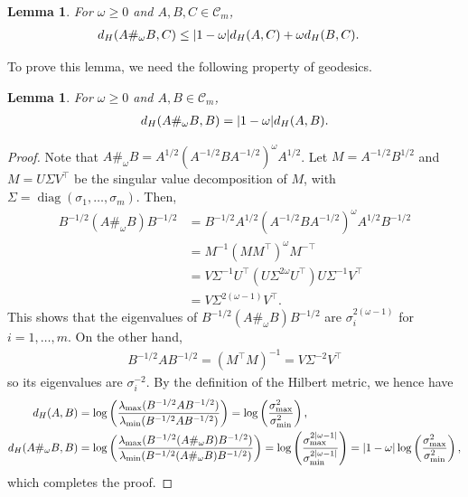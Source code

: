 \documentclass[a4paper]{article}
\newcommand{\caC}{\mathcal{C}}
\DeclareMathOperator{\diag}{diag}
\DeclarePairedDelimiter{\abs}{\lvert}{\rvert}
\newtheorem{lemma}[theorem]{Lemma}
\theoremstyle{definition}
\numberwithin{equation}{section}
\begin{document}
\begin{lemma}\label{lem:Hilbert-omega}
For $\omega \geq 0$ and $A, B, C \in \caC_m$,
\begin{align*}
 d_H(A \#_{\omega} B, C) &\leq \abs{1-\omega} d_H(A, C) + \omega d_H(B, C).
\end{align*}
\end{lemma}

To prove this lemma, we need the following property of geodesics.

\begin{lemma}\label{lem:Hilbert-delta}
For $\omega \ge 0$ and $A, B \in \caC_m$,
\begin{align*}
 d_H(A \#_\omega B, B) = \abs{1-\omega} d_H(A, B).
\end{align*}
\end{lemma}
\begin{proof}
Note that $A \#_\omega B = A^{1/2} (A^{-1/2} B A^{-1/2})^\omega A^{1/2}$. Let $M = A^{-1/2}B^{1/2}$ and $M = U \Sigma V^\top$ be the singular value decomposition of $M$, with $\Sigma = \diag(\sigma_1,\dots,\sigma_m)$. Then, 
\begin{align*}
 B^{-1/2} (A \#_\omega B) B^{-1/2} 
 &= B^{-1/2} A^{1/2} (A^{-1/2} B A^{-1/2})^\omega A^{1/2} B^{-1/2} \\
 &= M^{-1} (MM^\top)^\omega M^{-\top} \\
 &= V\Sigma^{-1} U^\top (U \Sigma^{2\omega} U^\top) U \Sigma^{-1} V^\top \\
 &= V\Sigma^{2(\omega - 1)} V^\top.
\end{align*}
This shows that the eigenvalues of $B^{-1/2} (A \#_\omega B) B^{-1/2}$ are $\sigma_i^{2(\omega -1)}$ for $i=1, \dots, m$. On the other hand, 
\begin{align*}
 B^{-1/2} A B^{-1/2} = (M^\top M)^{-1} = V \Sigma^{-2} V^\top
\end{align*}
so its eigenvalues are $\sigma_i^{-2}$. By the definition of the Hilbert metric, we hence have
\begin{align*}
 d_H(A, B) &= \log \left(\frac{\lambda_{\max}(B^{-1/2} A B^{-1/2})}{\lambda_{\min}(B^{-1/2} A B^{-1/2})} \right) = \log \left(\frac{\sigma_{\max}^2}{\sigma_{\min}^2}\right), \\
 d_H(A \#_\omega B, B) &= \log \left(\frac{\lambda_{\max}(B^{-1/2} (A \#_\omega B) B^{-1/2})}{\lambda_{\min}(B^{-1/2} (A \#_\omega B) B^{-1/2})} \right) = \log \left( \frac{\sigma_{\max}^{2\abs{\omega-1}}}{\sigma_{\min}^{2\abs{\omega-1}}} \right) = \abs{1-\omega} \log \left(\frac{\sigma_{\max}^2}{\sigma_{\min}^2} \right),
\end{align*}
which completes the proof.
\end{proof}
\end{document}
